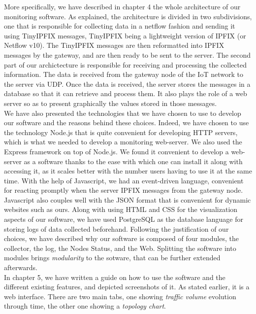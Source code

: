 More specifically, we have described in chapter 4 the whole architecture of our monitoring software. As explained, the architecture is divided in two subdivisions, one that is responsible for collecting data in a netflow fashion and sending it using TinyIPFIX messages, TinyIPFIX being a lightweight version of IPFIX (or Netflow v10). The TinyIPFIX messages are then reformatted into IPFIX messages by the gateway, and are then ready to be sent to the server. The second part of our archictecture is responsible for receiving and processing the collected information. The data is received from the gateway node of the IoT network to the server via UDP. Once the data is received, the server stores the messages in a database so that it can retrieve and process them. It also plays the role of a web server so as to present graphically the values stored in those messages. \\

We have also presented the technologies that we have chosen to use to develop our software and the reasons behind these choices. Indeed, we have chosen to use the technology Node.js that is quite convenient for developing HTTP servers, which is what we needed to develop a monitoring web-server. We also used the Express framework on top of Node.js. We found it convenient to develop a web-server as a software thanks to the ease with which one can install it along with accessing it, as it scales better with the number users having to use it at the same time. With the help of Javascript, we had an event-driven language, convenient for reacting promptly when the server IPFIX messages from the gateway node. Javascript also couples well with the JSON format that is convenient for dynamic websites such as ours. Along with using HTML and CSS for the visualization aspects of our software, we have used PostgreSQL as the database language for storing logs of data collected beforehand. Following the justification of our choices, we have described why our software is composed of four modules, the collector, the log, the Nodes Status, and the Web. Splitting the software into modules brings \textit{modularity} to the sotware, that can be further extended afterwards.\\

In chapter 5, we have written a guide on how to use the software and the different existing features, and depicted screenshots of it. As stated earlier, it is a web interface. There are two main tabs, one showing \textit{traffic volume} evolution through time, the other one showing a \textit{topology chart}. \\

